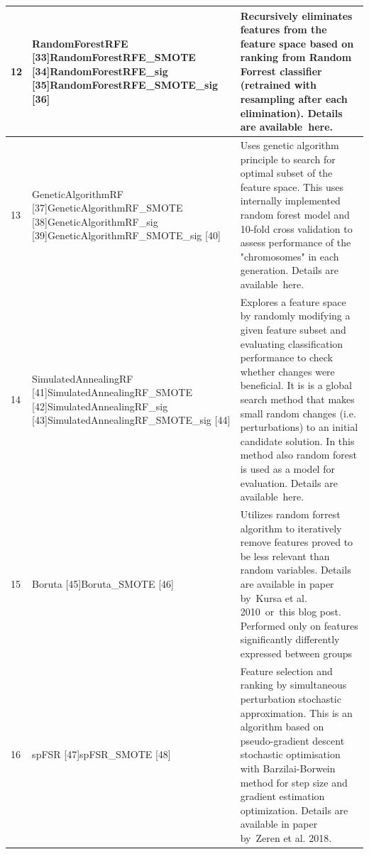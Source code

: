 \documentclass[article]{jss}
\begin{document}
\begin{tabular}{|p{0.2in}|p{2.0in}|p{3.9in}|}
12 & RandomForestRFE [33]\newline RandomForestRFE\_SMOTE [34]\newline RandomForestRFE\_sig [35]\newline RandomForestRFE\_SMOTE\_sig [36] & Recursively eliminates features from the feature space based on ranking from Random Forrest classifier (retrained with resampling after each elimination). Details are available~here. \\ \hline
13 & GeneticAlgorithmRF [37]\newline GeneticAlgorithmRF\_SMOTE [38]\newline GeneticAlgorithmRF\_sig [39]\newline GeneticAlgorithmRF\_SMOTE\_sig [40] & Uses genetic algorithm principle to search for optimal subset of the feature space. This uses internally implemented random forest model and 10-fold cross validation to assess performance of the "chromosomes" in each generation. Details are available~here. \\ \hline
14 & SimulatedAnnealingRF [41]\newline SimulatedAnnealingRF\_SMOTE [42]\newline SimulatedAnnealingRF\_sig [43]\newline SimulatedAnnealingRF\_SMOTE\_sig [44] & Explores a feature space by randomly modifying a given feature subset and evaluating classification performance to check whether changes were beneficial. It is is a global search method that makes small random changes (i.e. perturbations) to an initial candidate solution. In this method also random forest is used as a model for evaluation. Details are available~here. \\ \hline
15 & Boruta [45]\newline Boruta\_SMOTE [46] & Utilizes random forrest algorithm to iteratively remove features proved to be less relevant than random variables. Details are available in paper by~Kursa et al. 2010~or~this blog post. Performed only on features significantly differently expressed between groups  \\ \hline
16 & spFSR [47]\newline spFSR\_SMOTE [48] & Feature selection and ranking by simultaneous perturbation stochastic approximation. This is an algorithm based on pseudo-gradient descent stochastic optimisation with Barzilai-Borwein method for step size and gradient estimation optimization. Details are available in paper by~Zeren et al. 2018. \\ \hline

\end{tabular}
\end{document}

